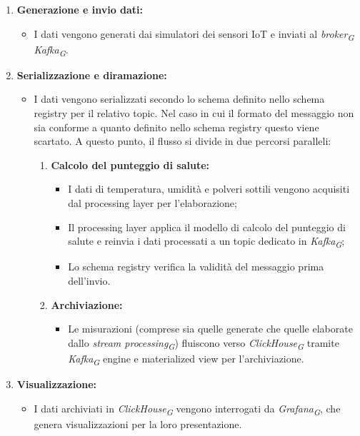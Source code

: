 \begin{enumerate}
    \item \textbf{Generazione e invio dati:}
    \begin{itemize}
        \item I dati vengono generati dai simulatori dei sensori IoT e inviati al \textit{broker}\textsubscript{\textit{G}} \textit{Kafka}\textsubscript{\textit{G}}.
    \end{itemize}
    
    \item \textbf{Serializzazione e diramazione:}
    \begin{itemize}
        \item I dati vengono serializzati secondo lo schema definito nello schema registry per il relativo topic.
        Nel caso in cui il formato del messaggio non sia conforme a quanto definito nello schema registry questo viene scartato. A questo punto, il flusso si divide in due percorsi paralleli:
        \begin{enumerate}
            \item \textbf{Calcolo del punteggio di salute:}
            \begin{itemize}
                \item I dati di temperatura, umidità e polveri sottili vengono acquisiti dal processing layer per l'elaborazione;
                \item Il processing layer applica il modello di calcolo del punteggio di salute e reinvia i dati processati a un topic dedicato in \textit{Kafka}\textsubscript{\textit{G}};
                \item Lo schema registry verifica la validità del messaggio prima dell'invio.
            \end{itemize}
            
            \item \textbf{Archiviazione:}
            \begin{itemize}
                \item Le misurazioni (comprese sia quelle generate che quelle elaborate dallo \textit{stream processing}\textsubscript{\textit{G}}) fluiscono verso \textit{ClickHouse}\textsubscript{\textit{G}} tramite \textit{Kafka}\textsubscript{\textit{G}} engine e materialized view per l'archiviazione.
            \end{itemize}
        \end{enumerate}
    \end{itemize}
    
    \item \textbf{Visualizzazione:}
    \begin{itemize}
        \item I dati archiviati in \textit{ClickHouse}\textsubscript{\textit{G}} vengono interrogati da \textit{Grafana}\textsubscript{\textit{G}}, che genera visualizzazioni per la loro presentazione.
    \end{itemize}
\end{enumerate}
